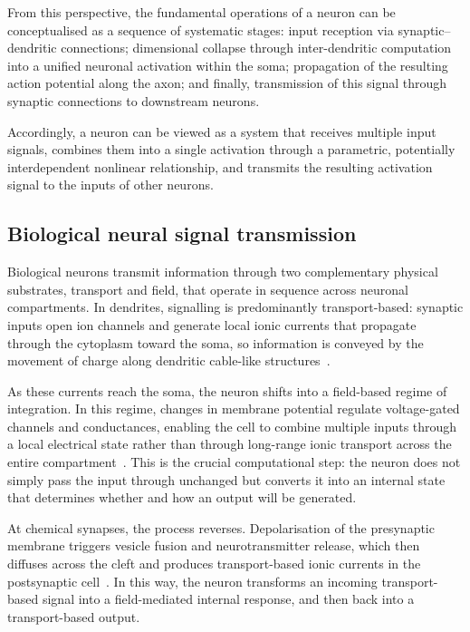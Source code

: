 \documentclass[11pt,a4paper]{article}
\numberwithin{equation}{section}
\begin{document}
From this perspective, the fundamental operations of a neuron can be conceptualised as a sequence of systematic
stages: input reception via synaptic--dendritic connections; dimensional collapse through inter-dendritic
computation into a unified neuronal activation within the soma; propagation of the resulting action potential along
the axon; and finally, transmission of this signal through synaptic connections to downstream neurons.

Accordingly, a neuron can be viewed as a system that receives multiple input signals, combines them into a single
activation through a parametric, potentially interdependent nonlinear relationship, and transmits the resulting
activation signal to the inputs of other neurons.

\subsection{Biological neural signal transmission}

Biological neurons transmit information through two complementary physical substrates, transport and field, that
operate in sequence across neuronal compartments. In dendrites, signalling is predominantly transport-based:
synaptic inputs open ion channels and generate local ionic currents that propagate through the cytoplasm toward the
soma, so information is conveyed by the movement of charge along dendritic cable-like structures~\cite{rall1994}.

As these currents reach the soma, the neuron shifts into a field-based regime of integration. In this regime,
changes in membrane potential regulate voltage-gated channels and conductances, enabling the cell to combine
multiple inputs through a local electrical state rather than through long-range ionic transport across the entire
compartment~\cite{koch2001,hodgkin1952}. This is the crucial computational step: the neuron does not simply pass the
input through unchanged but converts it into an internal state that determines whether and how an output will be
generated.

At chemical synapses, the process reverses. Depolarisation of the presynaptic membrane triggers vesicle fusion and
neurotransmitter release, which then diffuses across the cleft and produces transport-based ionic currents in the
postsynaptic cell~\cite{sudhof2013}. In this way, the neuron transforms an incoming transport-based signal into a
field-mediated internal response, and then back into a transport-based output.
\end{document}
